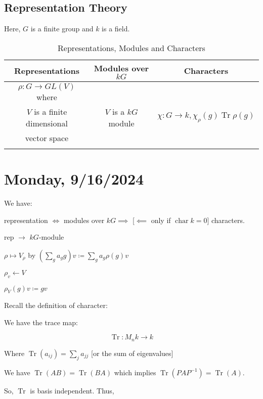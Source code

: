 \documentclass{article}
\theoremstyle{definition}
\newcommand{\Char}{\operatorname{char}}
\newcommand{\Tr}{\operatorname{Tr}}
\begin{document}
\subsection*{Representation Theory}

Here, \(G\) is a finite group and \(k\) is a field.

\begin{table}[H]
    \centering
    \begin{tabular}{c|c|c}
        \toprule
            Representations & Modules over \(k G\) &  Characters \\
        \midrule
            \(\rho : G \to GL(V)\) where  &  &   \\
            \(V\) is a finite dimensional & \(V\) is a \(kG\) module &  \(\chi : G \to k, \chi_{\rho}(g) \Tr \rho (g)\) \\
            vector space &  &   \\
             &  &   \\
        \bottomrule
    \end{tabular}
    \caption{Representations, Modules and Characters}
    \label{tab:reptable}
\end{table}


\section*{Monday, 9/16/2024}

We have:

\begin{center}
    representation \(\iff\) modules over \(kG \implies\) [\(\impliedby\) only if \(\Char k = 0\)] characters.
\end{center}

rep \(\to\) \(kG\)-module 

\(\rho \mapsto V_\rho\) by \((\sum_{g} a_g g)v \coloneqq \sum_{g} a_g \rho (g) v\) 

\(\rho_v \leftarrow V\)

\(\rho_V(g)v \coloneqq gv\) 

Recall the definition of character:

We have the trace map:

\[
    \Tr: M_n k \to k
\]

Where \(\Tr(a_{ij})=\sum_{j} a_{j j}\) [or the sum of eigenvalues]

We have \(\Tr(AB)=\Tr(BA)\) which implies \(\Tr(P A P ^{-1}) =\Tr(A)\). 

So, \(\Tr\) is basis independent. Thus,
\end{document}

